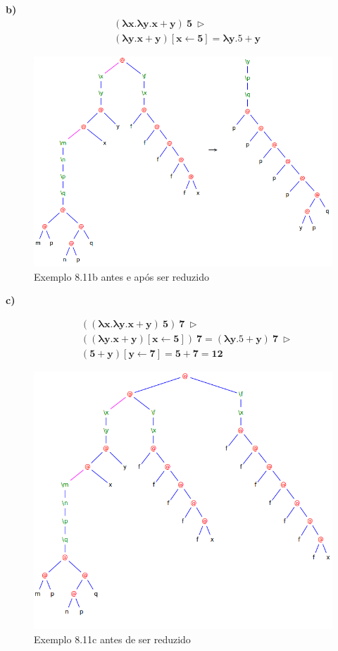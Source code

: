 \documentclass[a4paper]{article}
\begin{document}
\FloatBarrier
\textbf{b)}
\begin{align*}
&\mathbf{(\lambda x.\lambda y.x + y)\ 5\ \rhd }\\
&\mathbf{(\lambda y.x + y) [x \leftarrow 5] = \lambda y.5 + y}
\end{align*}

\begin{figure}[h]
  \centering
  \includegraphics[scale=0.5]{8-11_b.png}
  \caption{Exemplo 8.11b antes e após ser reduzido}
\end{figure}

\FloatBarrier

\textbf{c)}

\begin{align*}
&\mathbf{((\lambda x.\lambda y.x + y)\ 5)\ 7\ \rhd} \\
&\mathbf{((\lambda y.x + y) [x \leftarrow 5])\ 7 = (\lambda y.5 + y)\ 7\ \rhd} \\
&\mathbf{(5 + y)[y \leftarrow 7] = 5 + 7 = 12}
\end{align*}

\begin{figure}[h]
  \centering
  \includegraphics[scale=0.5]{8-11c_1.png}
  \caption{Exemplo 8.11c antes de ser reduzido}
\end{figure}
\end{document}
